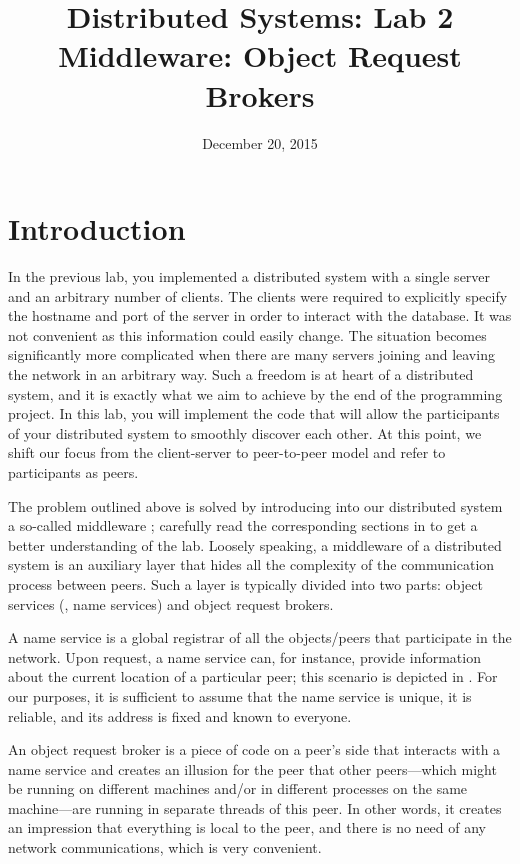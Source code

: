 \documentclass[a4paper]{article}
\title{Distributed Systems: Lab 2\\Middleware: Object Request Brokers}
\author{}
\date{December 20, 2015}
\begin{document}
\maketitle

\section{Introduction}

In the previous lab, you implemented a distributed system with a single server
and an arbitrary number of clients. The clients were required to explicitly
specify the hostname and port of the server in order to interact with the
database. It was not convenient as this information could easily change. The
situation becomes significantly more complicated when there are many servers
joining and leaving the network in an arbitrary way. Such a freedom is at heart
of a distributed system, and it is exactly what we aim to achieve by the end of
the programming project. In this lab, you will implement the code that will
allow the participants of your distributed system to smoothly discover each
other. At this point, we shift our focus from the client-server to peer-to-peer
model \cite{lecture3} and refer to participants as peers.

The problem outlined above is solved by introducing into our distributed system
a so-called middleware \cite{lecture4}; carefully read the corresponding
sections in \cite{lecture4} to get a better understanding of the lab. Loosely
speaking, a middleware of a distributed system is an auxiliary layer that hides
all the complexity of the communication process between peers. Such a layer is
typically divided into two parts: object services (\eg, name services) and
object request brokers.

A name service is a global registrar of all the objects/peers that participate
in the network. Upon request, a name service can, for instance, provide
information about the current location of a particular peer; this scenario is
depicted in . For our purposes, it is sufficient to assume
that the name service is unique, it is reliable, and its address is fixed and
known to everyone.

An object request broker \cite{lecture4, orb} is a piece of code on a peer's
side that interacts with a name service and creates an illusion for the peer
that other peers---which might be running on different machines and/or in
different processes on the same machine---are running in separate threads of
this peer. In other words, it creates an impression that everything is local to
the peer, and there is no need of any network communications, which is very
convenient.
\end{document}
